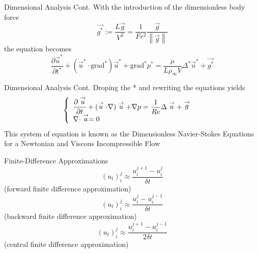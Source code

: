 \documentclass[frames]{prosper}
\begin{document}
\begin{slide}[Dissolve]{Dimensional Analysis Cont.}
With the introduction of the dimensionless body force $$ \stackrel{\rightarrow}{g^{*}} := \frac{L \stackrel{\rightarrow}{g}}{V^2} = \frac{1}{Fr^2}\frac{\stackrel{\rightarrow}{g}}{\left\|\stackrel{\rightarrow}{g}\right\|} $$ the equation becomes $$ \frac{\partial \stackrel{\rightarrow}{u}^*}{\partial t^*} + (\stackrel{\rightarrow}{u}^* \cdot \mbox{grad}^*)\stackrel{\rightarrow}{u}^* + \mbox{grad}^* p^* = \frac{\mu}{L\rho_{\infty}V} \Delta^* \stackrel{\rightarrow}{u}^* + \stackrel{\rightarrow}{g^{*}} $$
\end{slide}

\begin{slide}[Dissolve]{Dimensional Analysis Cont.}
Droping the * and rewriting the equations yields
\begin{eqnarray*}
\left \{
\begin{array}{l r}
\displaystyle{\frac{\partial \stackrel{\rightarrow}{u}}{\partial t} + (\stackrel{\rightarrow}{u} \cdot \nabla)\stackrel{\rightarrow}{u} + \nabla p = \frac{1}{Re}\Delta\stackrel{\rightarrow}{u} + \stackrel{\rightarrow}{g}}\\
\nabla \cdot \stackrel{\rightarrow}{u} = 0 &
\end{array}
\right. 
\end{eqnarray*}
This system of equation is known as the Dimensionless Navier-Stokes Equations for a Newtonian and Viscous Incompressible Flow
\end{slide}


\begin{slide}[Dissolve]{Finite-Difference Approximations}
$$ (u_{t})_{i}^{j} \approx \frac{u_{i}^{j+1} - u_{i}^{j}}{\delta t} $$ (forward finite difference approximation)
$$ (u_{t})_{i}^{j} \approx \frac{u_{i}^{j} - u_{i}^{j-1}}{\delta t} $$ (backward finite difference approximation)
$$ (u_{t})_{i}^{j} \approx \frac{u_{i}^{j+1} - u_{i}^{j-1}}{2\delta t} $$ (central finite difference approximation)
\end{slide}
\end{document}

